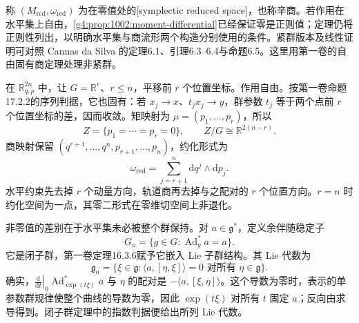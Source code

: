 称 \((M_{\mathrm{red}},\omega_{\mathrm{red}})\) 为在零值处的[symplectic reduced space]，也称辛商。若作用在水平集上自由，\cref{g4:prop:1002:moment-differential}已经保证零是正则值；定理仍将正则性列出，以明确水平集与商流形两个构造分别使用的条件。紧群版本及线性证明可对照 Cannas da Silva 的定理6.1、引理6.3--6.4与命题6.5。这里用第一卷的自由固有商定理处理非紧群。\cite[第6.1节，第160--163页]{Cannas2006Symplectic}



\begin{example}\label{g4:exm:1002:translation-reduction}
	在 \(\mathbb R^{2n}_{q,p}\) 中，让 \(G=\mathbb R^r\)、\(r\le n\)，平移前 \(r\) 个位置坐标。作用自由。按第一卷命题17.2.2的序列判据，它也固有：若 \(x_j\to x\)、\(t_jx_j\to y\)，群参数 \(t_j\) 等于两个点前 \(r\) 个位置坐标的差，因而收敛。矩映射为 \(\mu=(p_1,\ldots,p_r)\)，所以
	\[
		Z=\{p_1=\cdots=p_r=0\},\qquad
		Z/G\cong\mathbb R^{2(n-r)}.
	\]
	商映射保留 \((q^{r+1},\ldots,q^n,p_{r+1},\ldots,p_n)\)，约化形式为
	\[
		\omega_{\mathrm{red}}=\sum_{j=r+1}^n\mathrm{d}q^j\wedge\mathrm{d}p_j.
	\]
	水平约束先去掉 \(r\) 个动量方向，轨道商再去掉与之配对的 \(r\) 个位置方向。\(r=n\) 时约化空间为一点，其零二形式在零维切空间上非退化。
\end{example}

非零值的差别在于水平集未必被整个群保持。对 \(a\in\mathfrak g^*\)，定义余伴随稳定子
\[
	G_a=\{g\in G:\operatorname{Ad}_g^*a=a\}.
\]
它是闭子群，第一卷定理16.3.6赋予它嵌入 Lie 子群结构。其 Lie 代数为
\begin{equation}\label{g4:eq:1002:coadjoint-stabilizer-algebra}
	\mathfrak g_a=\{\xi\in\mathfrak g:
	\langle a,[\eta,\xi]\rangle=0\text{ 对所有 }\eta\in\mathfrak g\}.
\end{equation}
确实，\(\left.\frac{\mathrm{d}}{\mathrm{d}t}\right|_0\operatorname{Ad}_{\exp(t\xi)}^*a\) 与 \(\eta\) 的配对是 \(-\langle a,[\xi,\eta]\rangle\)。这个导数为零时，表示的单参数群规律使整个曲线的导数为零，因此 \(\exp(t\xi)\) 对所有 \(t\) 固定 \(a\)；反向由求导得到。闭子群定理中的指数判据便给出所列 Lie 代数。

